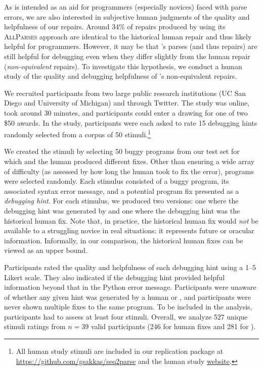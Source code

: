 
As \toolname is intended as an aid for programmers (especially novices) faced
with parse errors, we are also interested in subjective human judgments of the
quality and helpfulness of our repairs. Around 34\% of repairs produced by
\toolname using its \textsc{AllParses} approach are identical to the historical
human repair and thus likely helpful for programmers. However, it may be that
\toolname's parses (and thus repairs) are still helpful for debugging even when
they differ slightly from the human repair (\ie \textit{non-equivalent}
repairs). To investigate this hypothesis, we conduct a human study of the
quality and debugging helpfulness of \toolname's non-equivalent repairs.

 We recruited participants from two large public
research institutions (UC San Diego and University of Michigan) and through
Twitter. The study was online, took around 30 minutes, and participants could
enter a drawing for one of two \$50 awards. In the study, participants were each
asked to rate 15 debugging hints randomly selected from a corpus of 50
stimuli.\footnote{All human study stimuli are included in our replication
package at \url{https://github.com/gsakkas/seq2parse} and the human study
\href{https://dijkstra.eecs.umich.edu/~endremad/APR_HumanEval/}{website}.}

We created the stimuli by selecting 50 buggy programs from our test set for
which \toolname and the human produced different fixes. Other than ensuring a
wide array of difficulty (as assessed by how long the human took to fix the
error), programs were selected randomly. Each stimulus consisted of a buggy
program, its associated syntax error message, and a potential program fix
presented as a \emph{debugging hint}. For each stimulus, we produced two
versions: one where the debugging hint was generated by \toolname and one where
the debugging hint was the historical human fix. Note that, in practice, the
historical human fix would \emph{not} be available to a struggling novice
in real situations: it represents future or oracular information. Informally, in
our comparison, the historical human fixes can be viewed as an upper bound.

Participants rated the quality and
helpfulness of each debugging hint using a 1--5 Likert scale. They also indicated
if the debugging hint provided helpful information beyond that in the Python
error message.
Participants were unaware of whether any given hint was generated by a human or
\toolname, and participants were never shown multiple
fixes to the same program. To be included in the analysis, participants
had to assess at least four stimuli. Overall, we analyze 527 unique stimuli
ratings from $n=39$ valid participants (246 for human fixes and 281 for
\toolname).

